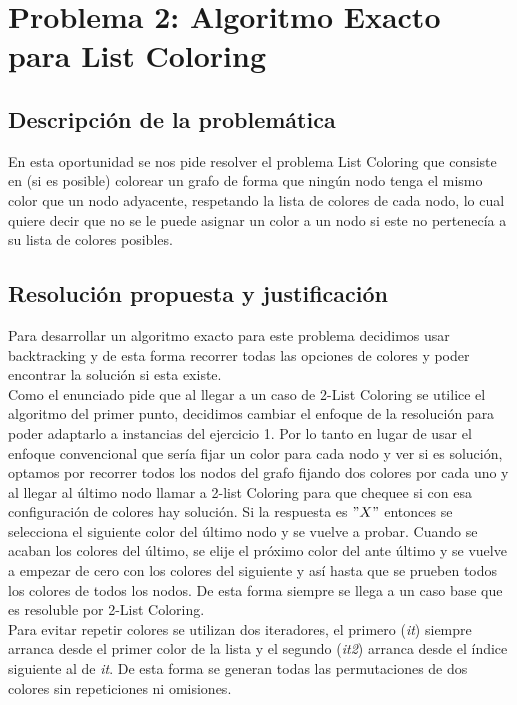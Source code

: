 \newpage
\section{Problema 2: Algoritmo Exacto para List Coloring}

\subsection{Descripción de la problemática}
En esta oportunidad se nos pide resolver el problema List Coloring que consiste en (si es posible) colorear un grafo de forma que ningún nodo tenga el mismo color que un nodo adyacente, respetando la lista de colores de cada nodo, lo cual quiere decir que no se le puede asignar un color a un nodo si este no pertenecía a su lista de colores posibles. 

\subsection{Resolución propuesta y justificación}

Para desarrollar un algoritmo exacto para este problema decidimos usar backtracking y de esta forma recorrer todas las opciones de colores y poder encontrar la solución si esta existe.\\

Como el enunciado pide que al llegar a un caso de 2-List Coloring se utilice el algoritmo del primer punto, decidimos cambiar el enfoque de la resolución para poder adaptarlo a instancias del ejercicio 1. Por lo tanto en lugar de usar el enfoque convencional que sería fijar un color para cada nodo y ver si es solución, optamos por recorrer todos los nodos del grafo fijando dos colores por cada uno y al llegar al último nodo llamar a 2-list Coloring para que chequee si con esa configuración de colores hay solución. Si la respuesta es $"X"$ entonces se selecciona el siguiente color del último nodo y se vuelve a probar. Cuando se acaban los colores del último, se elije el próximo color del ante último y se vuelve a empezar de cero con los colores del siguiente y así hasta que se prueben todos los colores de todos los nodos. De esta forma siempre se llega a un caso base que es resoluble por 2-List Coloring.\\

Para evitar repetir colores se utilizan dos iteradores, el primero (\emph{it}) siempre arranca desde el primer color de la lista y el segundo (\emph{it2}) arranca desde el índice siguiente al de \emph{it}. De esta forma se generan todas las permutaciones de dos colores sin repeticiones ni omisiones.


